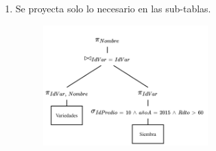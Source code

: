 \documentclass{templateNote}
\begin{document}
\begin{enumerate}
\begin{enumerate}
\begin{enumerate}
            \item Se proyecta solo lo necesario en las sub-tablas.
            \begin{figure}[H]
                \centering
                \includegraphics[width=0.6\textwidth]{img/E2-Paso6.png}
            \end{figure}
        \end{enumerate}
    \end{enumerate}


\end{enumerate}
\end{document}
